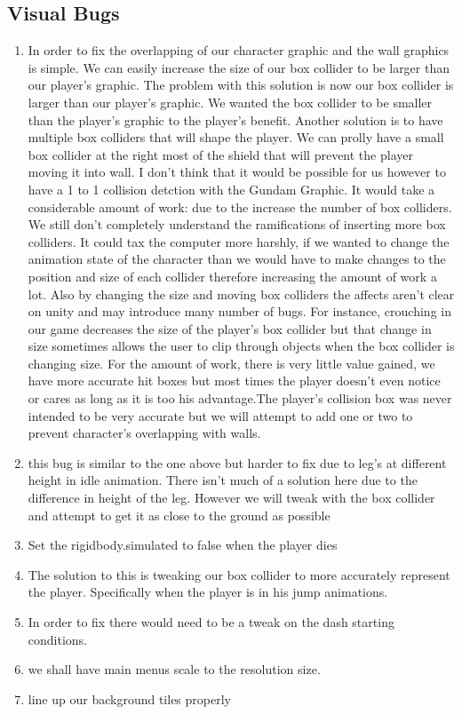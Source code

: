 \documentclass{article}
\begin{document}
\subsection*{Visual Bugs}
\begin{enumerate}
		\item In order to fix the overlapping of our character graphic and the wall graphics is simple. We can easily increase the size of our box collider to be larger than our player's graphic. The problem with this solution is now our box collider is larger than our player's graphic. We wanted the box collider to be smaller than the player's graphic
		to the player's benefit. Another solution is to have multiple box colliders that will shape the player. We can prolly have a small box collider at the right most of the shield that will prevent the player moving it into wall. I don't think that it would be possible for us however to have a 1 to 1 collision detction with the Gundam Graphic. It would take a considerable amount of work: due to the increase the number of box colliders. We still don't completely understand the ramifications of inserting more box colliders. It could tax the computer more harshly, if we wanted to change the animation state of the character than we would have to make changes to the position and size of each collider therefore increasing the amount of work a lot. Also by changing the size and moving box colliders the affects aren't clear on unity and may introduce many number of bugs. For instance, crouching in our game decreases the size of the player's box collider but that change in size sometimes allows the user to clip through objects when the box collider is changing size.  For the amount of work, there is very little value gained, we have more accurate hit boxes but most times the player doesn't even notice or cares as long as it is too his advantage.The player's collision box was never intended to be very accurate but we will attempt to add one or two to prevent character's overlapping with walls.
		\item this bug is similar to the one above but harder to fix due to leg's at different height in idle animation. There isn't much of a solution here due to the difference in height of the leg. However we will tweak with the box collider and attempt to get it as close to the ground as possible
		\item Set the rigidbody.simulated to false when the player dies 
		\item The solution to this is  tweaking our box collider to more accurately represent the player. Specifically when the player is in his jump animations.
		\item In order to fix there would need to be a tweak on the dash starting conditions.
			\item we shall have main menus scale to the resolution size.
			\item line up our background tiles properly
\end{enumerate}
\end{document}
